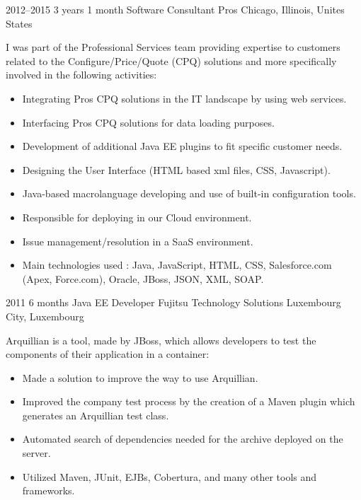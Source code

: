 \documentclass[]{friggeri-cv} %
\begin{document}

\begin{entrylist}

\entry
{2012--2015}
{3 years 1 month}
{Software Consultant} 
{Pros}
{Chicago, Illinois, Unites States}
{I was part of the Professional Services team providing expertise to customers related to the
Configure/Price/Quote (CPQ) solutions and more specifically involved in the following activities:\\

\vspace{-4mm}
\begin{itemize}
	\item Integrating Pros CPQ solutions in the IT landscape by using web services.
	\item Interfacing Pros CPQ solutions for data loading purposes.
	\item Development of additional Java EE plugins to fit specific customer needs.
    \item Designing the User Interface (HTML based xml files, CSS, Javascript).
    \item Java-based macrolanguage developing and use of built-in configuration tools.
    \item Responsible for deploying in our Cloud environment.
    \item Issue management/resolution in a SaaS environment.
    \item Main technologies used : Java, JavaScript, HTML, CSS, Salesforce.com (Apex, Force.com),
Oracle, JBoss, JSON, XML, SOAP.
\end{itemize}}
\vspace{-7mm}

\end{entrylist}


\begin{entrylist}

\entry
{2011}
{6 months}
{Java EE Developer} 
{Fujitsu Technology Solutions}
{Luxembourg City, Luxembourg}
{Arquillian is a tool, made by JBoss, which allows developers to test the components of their
application in a container:\\

\vspace{-4mm}
\begin{itemize}
	\item Made a solution to improve the way to use Arquillian.
	\item Improved the company test process by the creation of a Maven plugin which generates an Arquillian test class.
	\item Automated search of dependencies needed for the archive deployed on the server.
    \item Utilized Maven, JUnit, EJBs, Cobertura, and many other tools and frameworks.
\end{itemize}}
\vspace{-7mm}

\end{entrylist}
\end{document}
